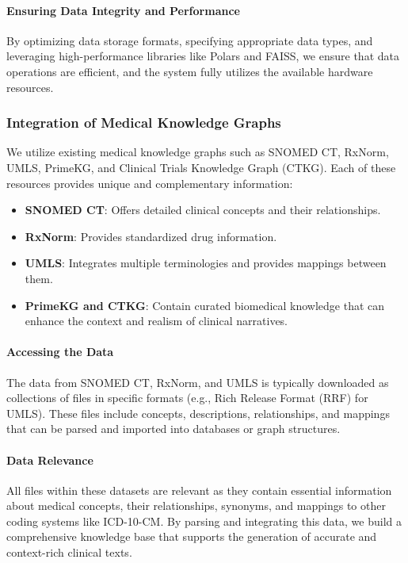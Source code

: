 \documentclass[12pt, a4paper]{article}
\begin{document}
\paragraph{Ensuring Data Integrity and Performance}

By optimizing data storage formats, specifying appropriate data types, and leveraging high-performance libraries like Polars and FAISS, we ensure that data operations are efficient, and the system fully utilizes the available hardware resources.

\subsubsection{Integration of Medical Knowledge Graphs}

We utilize existing medical knowledge graphs such as SNOMED CT, RxNorm, UMLS, PrimeKG, and Clinical Trials Knowledge Graph (CTKG). Each of these resources provides unique and complementary information:

\begin{itemize}
    \item \textbf{SNOMED CT}: Offers detailed clinical concepts and their relationships.
    \item \textbf{RxNorm}: Provides standardized drug information.
    \item \textbf{UMLS}: Integrates multiple terminologies and provides mappings between them.
    \item \textbf{PrimeKG and CTKG}: Contain curated biomedical knowledge that can enhance the context and realism of clinical narratives.
\end{itemize}

\paragraph{Accessing the Data}

The data from SNOMED CT, RxNorm, and UMLS is typically downloaded as collections of files in specific formats (e.g., Rich Release Format (RRF) for UMLS). These files include concepts, descriptions, relationships, and mappings that can be parsed and imported into databases or graph structures.

\paragraph{Data Relevance}

All files within these datasets are relevant as they contain essential information about medical concepts, their relationships, synonyms, and mappings to other coding systems like ICD-10-CM. By parsing and integrating this data, we build a comprehensive knowledge base that supports the generation of accurate and context-rich clinical texts.
\end{document}
